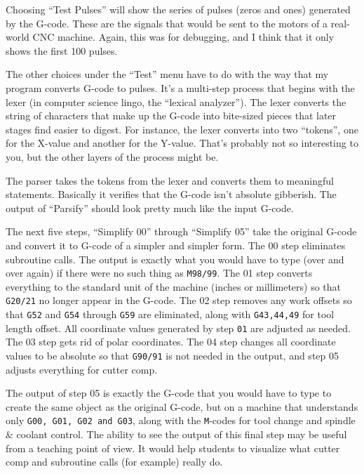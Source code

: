 \documentclass[titlepage,oneside,10pt]{article}
\begin{document}
Choosing ``Test Pulses'' will show the series of pulses (zeros and
ones) generated by the G-code. These are the signals that would be sent to the
motors of a real-world CNC machine. Again, this was for debugging, and
I think that it only shows the first 100 pulses.

The other choices under the ``Test'' menu have to do with the way that
my program converts G-code to pulses. It's a multi-step process that
begins with the lexer (in computer science lingo, the ``lexical
analyzer''). The lexer converts the string of 
characters that make up the G-code into bite-sized pieces that later
stages find easier to digest. For instance, the lexer converts 
\vskip 0.10cm
\vskip 0.10cm
\noindent into two ``tokens'', one for the X-value and another for the
Y-value. That's probably not so interesting to you, but the other
layers of the process might be.

The parser takes the tokens from the lexer and converts them to
meaningful statements. Basically it verifies that the G-code isn't
absolute gibberish. The output of ``Parsify'' should look pretty much
like the input G-code. 

The next five steps, ``Simplify 00'' through ``Simplify 05'' take the
original G-code and convert it to G-code of a simpler and simpler
form. The 00 step eliminates subroutine calls. The output is exactly what
you would have to type (over and over again) if there were no such
thing as {\tt M98/99}. The 01 step converts everything to the standard
unit of the machine (inches or millimeters) so that {\tt G20/21} no
longer appear in the G-code. The 02 step removes any work offsets so
that {\tt G52} and {\tt G54} through {\tt G59} are eliminated, along
with {\tt G43,44,49} for tool length offset. All coordinate values
generated by step {\tt 01} are adjusted as needed. The 03 step gets
rid of polar coordinates. The 04 step changes all coordinate values to
be absolute so that {\tt G90/91} is not needed in the output, and step
05 adjusts everything for cutter comp.

The output of step 05 is exactly the G-code that you would have to
type to create the same object as the original G-code, but on a
machine that understands only {\tt G00, G01, G02 and G03}, along with
the {\tt M}-codes for tool change and spindle \& coolant control. The ability
to see the output of this final step may be useful from a teaching
point of view. It would help students to visualize what cutter comp and
subroutine calls (for example) really do.
\end{document}
